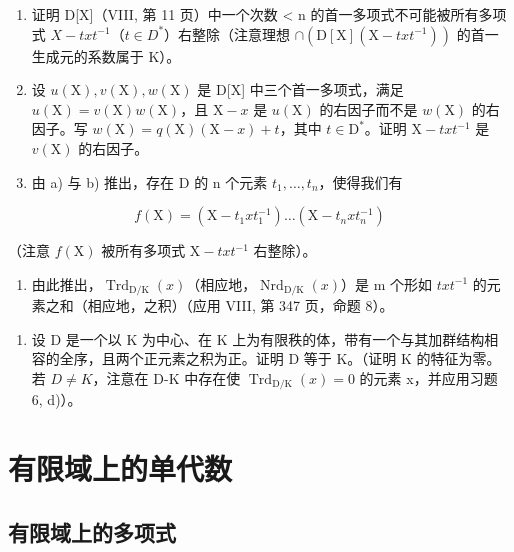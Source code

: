 \begin{enumerate}
\def\labelenumi{\alph{enumi})}
\item
  证明 D{[}X{]}（VIII, 第 11 页）中一个次数 \textless{} n 的首一多项式不可能被所有多项式 \(X - txt^{-1}\)（\(t \in D^{*}\)）右整除（注意理想 \(\cap(\mathrm{D}[\mathrm{X}](\mathrm{X}-txt^{-1}))\) 的首一生成元的系数属于 K）。
\item
  设 \(u(\mathrm{X}), v(\mathrm{X}), w(\mathrm{X})\) 是 D{[}X{]} 中三个首一多项式，满足 \(u(\mathrm{X}) = v(\mathrm{X})w(\mathrm{X})\)，且 \(\mathrm{X} - x\) 是 \(u(\mathrm{X})\) 的右因子而不是 \(w(\mathrm{X})\) 的右因子。写 \(w(\mathrm{X}) = q(\mathrm{X})(\mathrm{X} - x) + t\)，其中 \(t \in \mathrm{D}^*\)。证明 \(\mathrm{X} - txt^{-1}\) 是 \(v(\mathrm{X})\) 的右因子。
\item
  由 a) 与 b) 推出，存在 D 的 n 个元素 \(t_{1},\ldots,t_{n}\)，使得我们有
\end{enumerate}

\[
f (\mathrm{X}) = \left(\mathrm{X} - t _ {1} x t _ {1} ^ {- 1}\right) \dots \left(\mathrm{X} - t _ {n} x t _ {n} ^ {- 1}\right)
\]

（注意 \(f(\mathrm{X})\) 被所有多项式 \(\mathrm{X} - txt^{-1}\) 右整除）。

\begin{enumerate}
\def\labelenumi{\alph{enumi})}
\setcounter{enumi}{3}
\tightlist
\item
  由此推出，\(\operatorname{Trd}_{\mathrm{D}/\mathrm{K}}(x)\)（相应地，\(\operatorname{Nrd}_{\mathrm{D}/\mathrm{K}}(x)\)）是 m 个形如 \(txt^{-1}\) 的元素之和（相应地，之积）（应用 VIII, 第 347 页，命题 8）。
\end{enumerate}

\begin{enumerate}
\def\labelenumi{\arabic{enumi})}
\setcounter{enumi}{6}
\tightlist
\item
  设 D 是一个以 K 为中心、在 K 上为有限秩的体，带有一个与其加群结构相容的全序，且两个正元素之积为正。证明 D 等于 K。（证明 K 的特征为零。若 \(D \neq K\)，注意在 D-K 中存在使 \(\operatorname{Trd}_{\mathrm{D}/\mathrm{K}}(x) = 0\) 的元素 x，并应用习题 6, d)）。
\end{enumerate}

\section{有限域上的单代数}

\subsection{有限域上的多项式}

